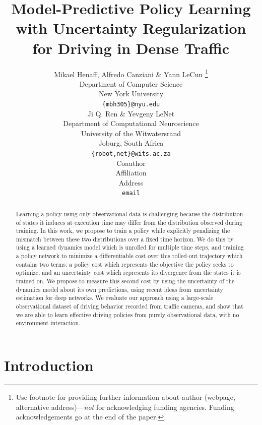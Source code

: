 \documentclass{article} %
\title{Model-Predictive Policy Learning with Uncertainty Regularization for Driving in Dense Traffic}
\author{Mikael Henaff, Alfredo Canziani \& Yann LeCun \thanks{ Use footnote for providing further information
about author (webpage, alternative address)---\emph{not} for acknowledging
funding agencies.  Funding acknowledgements go at the end of the paper.} \\
Department of Computer Science\\
New York University\\
\texttt{\{mbh305\}@nyu.edu} \\
\And
Ji Q. Ren \& Yevgeny LeNet \\
Department of Computational Neuroscience \\
University of the Witwatersrand \\
Joburg, South Africa \\
\texttt{\{robot,net\}@wits.ac.za} \\
\AND
Coauthor \\
Affiliation \\
Address \\
\texttt{email}
}
\begin{document}
\newcommand{\modelnamedrop}{MPUR }
\newcommand{\modelnameil}{MPER }

\maketitle

\begin{abstract}
  Learning a policy using only observational data is challenging because the distribution of states it induces at execution time may differ from the distribution observed during training.
  In this work, we propose to train a policy while explicitly penalizing the mismatch between these two distributions over a fixed time horizon.
We do this by using a learned dynamics model which is unrolled for multiple time steps, and training a policy network to minimize a differentiable cost over this rolled-out trajectory which contains two terms: a policy cost which represents the objective the policy seeks to optimize, and an uncertainty cost which represents its divergence from the states it is trained on. 
We propose to measure this second cost by using the uncertainty of the dynamics model about its own predictions, using recent ideas from uncertainty estimation for deep networks.
  We evaluate our approach using a large-scale observational dataset of driving behavior recorded from traffic cameras, and show that we are able to learn effective driving policies from purely observational data, with no environment interaction. 
\end{abstract}


\section{Introduction}
\end{document}
